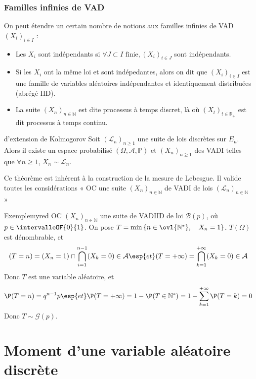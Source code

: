     \subsubsection{Familles infinies de VAD}

    On peut étendre un certain nombre de notions aux familles infinies de VAD $(X_i)_{i \in I}$ :
    \begin{itemize}
        \item Les $X_i$ sont indépendants si $\forall J \subset I \text{ finie}, (X_i)_{i \in J}$ sont indépendants.
        \item Si les $X_i$ ont la même loi et sont indépedantes, alors on dit que $(X_i)_{i \in I}$ est une famille de variables aléatoires indépendantes et identiquement distribuées (abrégé IID).
        \item La suite $(X_n)_{n \in \mathbb{N}}$ est dite processus à temps discret, là où $(X_t)_{t \in \mathbb{R}_+}$ est dit processus à temps continu.
    \end{itemize}

    \begin{theo}{d’extension de Kolmogorov}{}
        Soit $(\mathcal{L}_n)_{n \geq 1}$ une suite de lois discrètes sur $E_n$. Alors il existe un espace probabilisé $(\Omega, \mathcal{A}, \mathbb{P})$ et $(X_n)_{n \geq 1}$ des VADI telles que $\forall n \geq 1$, $X_n \sim \mathcal{L}_n$.
    \end{theo}

    Ce théorème est inhérent à la construction de la mesure de Lebesgue. Il valide toutes les considérations « OC une suite $(X_n)_{n \in \mathbb{N}}$ de VADI de lois $(\mathcal{L}_n)_{n \in \mathbb{N}} $ »

    \begin{omed}{Exemple}{myred}
        OC $(X_n)_{n \in \mathbb{N}}$ une suite de VADIID de loi $\mathcal{B}(p)$, où $p \in \intervalleOF{0}{1}$. On pose $T = \min\left\{n \in \ovl{\mathbb{N}^*}, \quad X_n = 1\right\}$. $T(\Omega)$ est dénombrable, et 
        \[ (T = n) = (X_n = 1) \cap \bigcap_{i = 1}^{n-1} (X_k = 0) \in \mathcal{A} \esp{et} (T = +\infty) = \bigcap_{k=1}^{+\infty} (X_k = 0) \in \mathcal{A} \]   
        Donc $T$ est une variable aléatoire, et 
        \[ \P(T = n) = q^{n-1} p \esp{et} \P(T = +\infty) = 1 - \P(T \in \mathbb{N}^*) = 1 - \sum_{k=1}^{+\infty} \P(T = k) = 0 \]   
        Donc $T \sim \mathcal{G}(p)$.
    \end{omed}

\section{Moment d’une variable aléatoire discrète}

